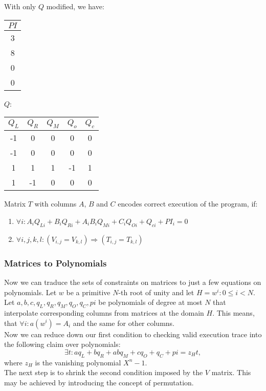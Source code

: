 \documentclass[../lecture-notes.tex]{subfiles}
\begin{document}
\begin{example}
\centering With only $Q$ modified, we have:
\begin{center}
\begin{tabular}{|c|}
\hline
$PI$ \\ 
\hline
3 \\ 
\hline
8 \\ 
\hline
0 \\ 
\hline
0 \\ 
\hline
\end{tabular}
$Q$: 
\begin{tabular}{|c|c|c|c|c|}
\hline
$Q_L$ & $Q_R$ & $Q_M$ & $Q_o$ & $Q_c$ \\ 
\hline
-1 & 0 & 0 & 0 & 0 \\ 
\hline
-1 & 0 & 0 & 0 & 0 \\ 
\hline
1 & 1 & 1 & -1 & 1 \\ 
\hline
1 & -1 & 0 & 0 & 0 \\ 
\hline
\end{tabular}
\end{center}
\end{example}

\begin{definition}
Matrix $T$ with columns $A$, $B$ and $C$ encodes correct execution of the program, if:
\begin{enumerate}
    \item \(\forall i: A_i Q_{Li} + B_i Q_{Ri} + A_i B_i Q_{Mi} + C_i Q_{Oi} + Q_{ci} + PI_i = 0\)
    \item \(\forall i, j, k, l: (V_{i,j} = V_{k,l}) \Rightarrow (T_{i,j} = T_{k,l})\)
\end{enumerate}
\end{definition}

\subsubsection{Matrices to Polynomials}

Now we can traduce the sets of constraints on matrices to just a few equations on polynomials. Let $w$ be a primitive $N$-th root of unity and let $H = w^i: 0 \le i < N$. Let \(a, b, c, q_L, q_R, q_M, q_O, q_C, pi\) be polynomials of degree at most $N$ that interpolate corresponding columns from matrices at the domain $H$. This means, that \(\forall i: a(w^i) = A_i\) and the same for other columns.
\\
Now we can reduce down our first condition to checking valid execution trace into the following claim over polynomials:
\[\exists t: aq_L + bq_R + abq_M + cq_O + q_C + pi = z_H t,\]
where $z_H$ is the vanishing polynomial $X^n - 1$.
\\
The next step is to shrink the second condition imposed by the $V$ matrix. This may be achieved by introducing the concept of permutation. 
\end{document}
